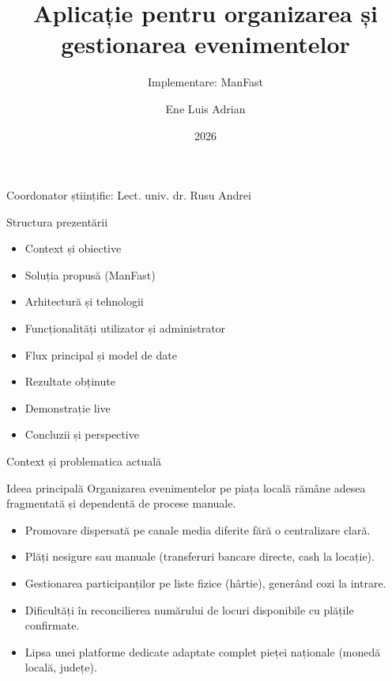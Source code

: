 \documentclass[aspectratio=169,12pt]{beamer}
\title{Aplicație pentru organizarea și gestionarea evenimentelor}
\subtitle{Implementare: ManFast}
\author{Ene Luis Adrian}
\institute{%
	Facultatea de Mathematică și Informatică\\
	Specializarea Informatică\\
	Universitatea Ovidius din Constanța
}
\date{2026}
\begin{document}
	
	\begin{frame}
		\titlepage
		\vspace{-0.5cm}
		\begin{center}
			\small Coordonator științific: Lect. univ. dr. Rusu Andrei
		\end{center}
	\end{frame}
	
	\begin{frame}{Structura prezentării}
		\begin{itemize}
			\item Context și obiective
			\item Soluția propusă (ManFast)
			\item Arhitectură și tehnologii
			\item Funcționalități utilizator și administrator
			\item Flux principal și model de date
			\item Rezultate obținute
			\item Demonstrație live
			\item Concluzii și perspective
		\end{itemize}
	\end{frame}
	
	\begin{frame}{Context și problematica actuală}
		\begin{block}{Ideea principală}
			Organizarea evenimentelor pe piața locală rămâne adesea fragmentată și dependentă de procese manuale.
		\end{block}
		\vspace{0.3cm}
		\begin{itemize}
			\item Promovare dispersată pe canale media diferite fără o centralizare clară.
			\item Plăți nesigure sau manuale (transferuri bancare directe, cash la locație).
			\item Gestionarea participanților pe liste fizice (hârtie), generând cozi la intrare.
			\item Dificultăți în reconcilierea numărului de locuri disponibile cu plățile confirmate.
			\item Lipsa unei platforme dedicate adaptate complet pieței naționale (monedă locală, județe).
		\end{itemize}
	\end{frame}
	
\end{document}
